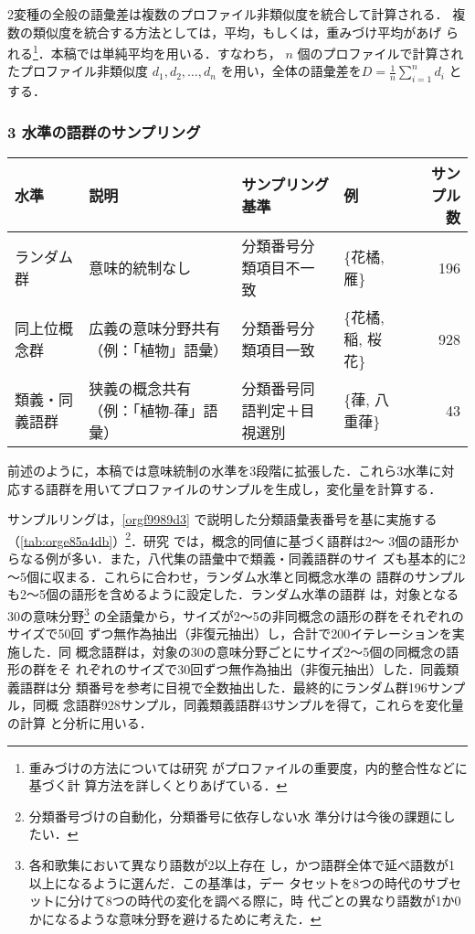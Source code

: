 \documentclass[submit]{ipsj}
\renewcommand{\ref}{\cref}
\begin{document}
2変種の全般の語彙差は複数のプロファイル非類似度を統合して計算される．
複数の類似度を統合する方法としては，平均，もしくは，重みづけ平均があげ
られる\footnote{重みづけの方法については研究 \cite{Ruette2014Semantic} がプロファイルの重要度，内的整合性などに基づく計
算方法を詳しくとりあげている．}．本稿では単純平均を用いる．すなわち，
\(n\) 個のプロファイルで計算されたプロファイル非類似度 \(d_1, d_2,
\ldots, d_n\) を用い，全体の語彙差を\(D=\frac{1}{n} \sum_{i=1}^{n}
d_i\) とする．
\subsubsection{3 水準の語群のサンプリング\label{orgc34c6cf}}
\label{sec:org66ff301}
\begin{table*}[t]
\caption{\label{tab:orge85a4db}3水準の語形集合のサンプル例}
\centering
\begin{tabular}{llllr}
水準 & 説明 & サンプリング基準 & 例 & サンプル数\\
\hline
ランダム群 & 意味的統制なし & 分類番号分類項目不一致 & \{花橘, 雁\} & 196\\
同上位概念群 & 広義の意味分野共有（例：「植物」語彙） & 分類番号分類項目一致 & \{花橘, 稲, 桜花\} & 928\\
類義・同義語群 & 狭義の概念共有（例：「植物-葎」語彙） & 分類番号同語判定＋目視選別 & \{葎, 八重葎\} & 43\\
\end{tabular}
\end{table*}

前述のように，本稿では意味統制の水準を3段階に拡張した．これら3水準に対
応する語群を用いてプロファイルのサンプルを生成し，変化量を計算する．

サンプルリングは，\ref{orgf9989d3} で説明した分類語彙表番号を基に実施する
（\ref{tab:orge85a4db}）\footnote{分類番号づけの自動化，分類番号に依存しない水
準分けは今後の課題にしたい．}．研究
\cite{Speelman2003Profilebased} では，概念的同値に基づく語群は2～
3個の語形からなる例が多い．また，八代集の語彙中で類義・同義語群のサイ
ズも基本的に2～5個に収まる．これらに合わせ，ランダム水準と同概念水準の
語群のサンプルも2～5個の語形を含めるように設定した．ランダム水準の語群
は，対象となる30の意味分野\footnote{各和歌集において異なり語数が2以上存在
し，かつ語群全体で延べ語数が1以上になるように選んだ．この基準は，デー
タセットを8つの時代のサブセットに分けて8つの時代の変化を調べる際に，時
代ごとの異なり語数が1か0かになるような意味分野を避けるために考えた．}
の全語彙から，サイズが2～5の非同概念の語形の群をそれぞれのサイズで50回
ずつ無作為抽出（非復元抽出）し，合計で200イテレーションを実施した．同
概念語群は，対象の30の意味分野ごとにサイズ2～5個の同概念の語形の群をそ
れぞれのサイズで30回ずつ無作為抽出（非復元抽出）した．同義類義語群は分
類番号を参考に目視で全数抽出した．最終的にランダム群196サンプル，同概
念語群928サンプル，同義類義語群43サンプルを得て，これらを変化量の計算
と分析に用いる．
\end{document}
